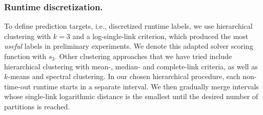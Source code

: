 \documentclass[runningheads]{llncs}
\begin{document}
%
%
%

\subsubsection{Runtime discretization.}

To define prediction targets, i.e., discretized runtime labels, we use hierarchical clustering with $k = 3$ and a log-single-link criterion, which produced the most \emph{useful} labels in preliminary experiments.
We denote this adapted solver scoring function with $s_3$.
Other clustering approaches that we have tried include hierarchical clustering with mean-, median- and complete-link criteria, as well as $k$-means and spectral clustering.
In our chosen hierarchical procedure, each non-time-out runtime starts in a separate interval.
We then gradually merge intervals whose single-link logarithmic distance is the smallest until the desired number of partitions is reached.
\end{document}
